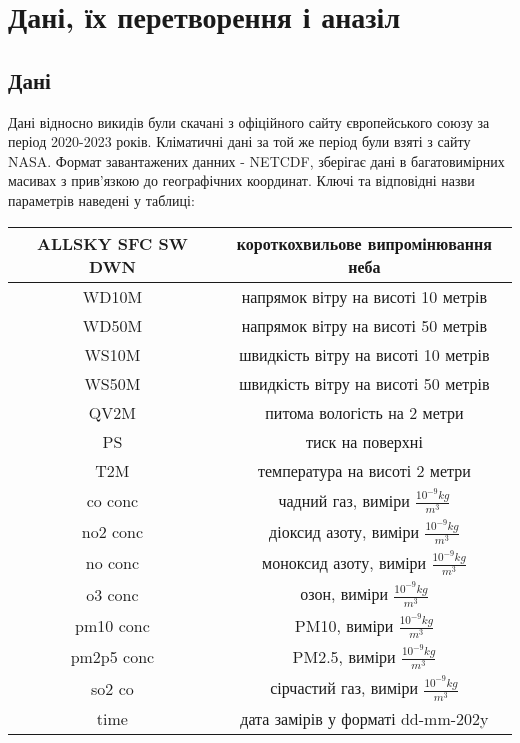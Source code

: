 \chapter{Дані, їх перетворення і аназіл}

\section{Дані}

Дані відносно викидів були скачані з офіційного сайту європейського союзу за період 2020-2023 років.
Кліматичні дані за той же період були взяті з сайту NASA. 
Формат завантажених данних - NETCDF, зберігає дані в багатовимірних масивах з прив'язкою до географічних координат.
Ключі та відповідні назви параметрів наведені у таблиці:


\begin{center}
    \begin{tabular}{|c | c|}
        \hline
        ALLSKY SFC SW DWN & короткохвильове випромінювання неба \\
        \hline
        WD10M & напрямок вітру на висоті 10 метрів \\ 
        \hline
        WD50M & напрямок вітру на висоті 50 метрів \\
        \hline
        WS10M & швидкість вітру на висоті 10 метрів \\
        \hline
        WS50M & швидкість вітру на висоті 50 метрів  \\
        \hline
        QV2M & питома вологість на 2 метри \\
        \hline
        PS & тиск на поверхні \\
        \hline
        T2M & температура на висоті 2 метри \\
        \hline
        co conc & чадний газ, виміри $\frac{10^{-9}kg}{m^{3}}$ \\
        \hline
        no2 conc & діоксид азоту, виміри $\frac{10^{-9}kg}{m^{3}}$ \\
        \hline
        no conc & моноксид азоту, виміри $\frac{10^{-9}kg}{m^{3}}$ \\
        \hline
        o3 conc & озон, виміри $\frac{10^{-9}kg}{m^{3}}$  \\
        \hline
        pm10 conc & PM10, виміри $\frac{10^{-9}kg}{m^{3}}$ \\
        \hline
        pm2p5 conc & PM2.5, виміри $\frac{10^{-9}kg}{m^{3}}$ \\
        \hline
        so2 co & сірчастий газ, виміри $\frac{10^{-9}kg}{m^{3}}$ \\
        \hline
        time & дата замірів у форматі dd-mm-202y \\
        \hline
    \end{tabular}
    
    \vspace{1cm}
\end{center}




